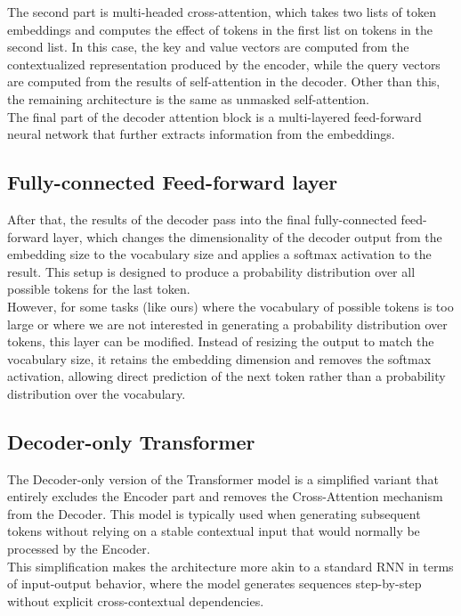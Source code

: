 The second part is multi-headed cross-attention, which takes two lists of token embeddings and computes the effect of tokens in the first list on tokens in the second list. In this case, the key and value vectors are computed from the contextualized representation produced by the encoder, while the query vectors are computed from the results of self-attention in the decoder. Other than this, the remaining architecture is the same as unmasked self-attention.
\\

The final part of the decoder attention block is a multi-layered feed-forward neural network that further extracts information from the embeddings.

\subsection{Fully-connected Feed-forward layer}

After that, the results of the decoder pass into the final fully-connected feed-forward layer, which changes the dimensionality of the decoder output from the embedding size to the vocabulary size and applies a softmax activation to the result. This setup is designed to produce a probability distribution over all possible tokens for the last token.
\\

However, for some tasks (like ours) where the vocabulary of possible tokens is too large or where we are not interested in generating a probability distribution over tokens, this layer can be modified. Instead of resizing the output to match the vocabulary size, it retains the embedding dimension and removes the softmax activation, allowing direct prediction of the next token rather than a probability distribution over the vocabulary.


\subsection{Decoder-only Transformer}

The Decoder-only version of the Transformer model is a simplified variant that entirely excludes the Encoder part and removes the Cross-Attention mechanism from the Decoder. This model is typically used when generating subsequent tokens without relying on a stable contextual input that would normally be processed by the Encoder.
\\

This simplification makes the architecture more akin to a standard RNN in terms of input-output behavior, where the model generates sequences step-by-step without explicit cross-contextual dependencies.

